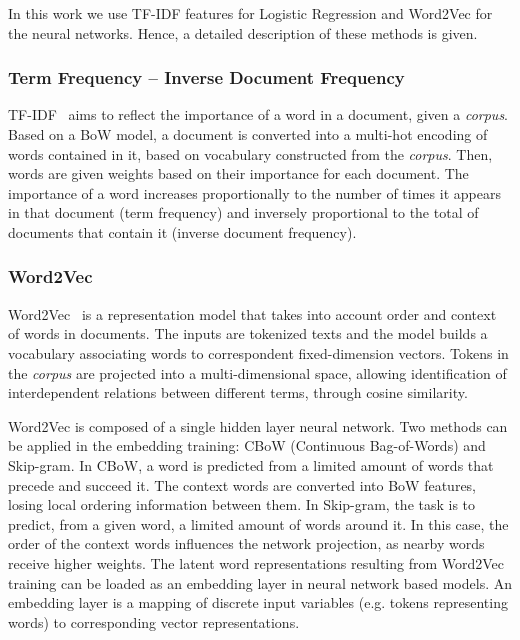 \documentclass[runningheads]{llncs}
\begin{document}
In this work we use TF-IDF features for Logistic Regression and Word2Vec for the neural networks. Hence, a detailed description of these methods is given.


\subsubsection{Term Frequency -- Inverse Document Frequency}

TF-IDF~\cite{saltonTermweightingApproachesAutomatic1988} aims to reflect the importance of a word in a document, given a \textit{corpus}. Based on a BoW model, a document is converted into a multi-hot encoding of words contained in it, based on vocabulary constructed from the \textit{corpus}. Then, words are given weights based on their importance for each document. The importance of a word increases proportionally to the number of times it appears in that document (term frequency) and inversely proportional to the total of documents that contain it (inverse document frequency).


\subsubsection{Word2Vec}

Word2Vec~\cite{mikolovEfficientEstimationWord2013} is a representation model that takes into account order and context of words in documents. The inputs are tokenized texts and the model builds a vocabulary associating words to correspondent fixed-dimension vectors. Tokens in the \textit{corpus} are projected into a multi-dimensional space, allowing identification of interdependent relations between different terms, through cosine similarity.

Word2Vec is composed of a single hidden layer neural network. Two methods can be applied in the embedding training: CBoW (Continuous Bag-of-Words) and Skip-gram. In CBoW, a word is predicted from a limited amount of words that precede and succeed it. The context words are converted into BoW features, losing local ordering information between them. In Skip-gram, the task is to predict, from a given word, a limited amount of words around it. In this case, the order of the context words influences the network projection, as nearby words receive higher weights. The latent word representations resulting from Word2Vec training can be loaded as an embedding layer in neural network based models. An embedding layer is a mapping of discrete input variables (e.g. tokens representing words) to corresponding vector representations.
\end{document}
